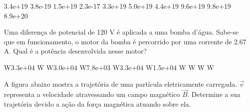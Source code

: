 \documentclass[12pt, addpoints]{exam}
\begin{document}
\begin{questions}
\begin{multicols*}{2}
\begin{oneparchoices}
\choice 3.4e+19 \choice 3.8e-19 \choice 1.5e+19 \choice 2.3e-17 \choice 3.3e+19 \choice 5.0e+19 \choice 4.4e+19 \choice 9.6e+19 \choice 9.8e+19 \choice 8.9e+20 
\end{oneparchoices}\question Uma diferença de potencial de 120 V é aplicada a uma bomba d’água. Sabe-se que em funcionamento, o motor da bomba é percorrido por uma corrente de    2.67 A. Qual é a potência desenvolvida nesse motor?

\begin{oneparchoices}
 W\choice 3.3e+04 W W\choice 3.0e+04 W\choice 7.8e+03 W\choice 3.3e+04 W\choice 1.5e+04 W W W W
\end{oneparchoices}\question A ﬁgura abaixo mostra a trajetória de uma partícula eletricamente carregada. $\vec{{v}}$ representa a velocidade atravessando um campo magnético $\vec{{B}}$. Determine a sua trajetória devido a ação da força magnética atuando sobre ela.
        
        \begin{center}
            \begin{minipage}[c]{0.5\linewidth}
            \end{minipage}
        \end{center}

        


\end{multicols*}
\end{questions}
\end{document}
